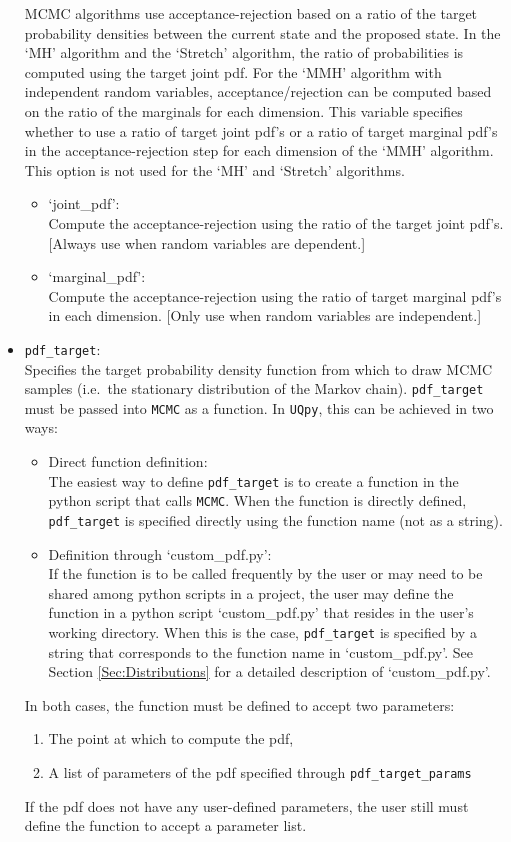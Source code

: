 \documentclass[./UsersGuide.tex]{subfiles}
\begin{document}
\begin{itemize}
	MCMC algorithms use acceptance-rejection based on a ratio of the target probability densities between the current state and the proposed state. In the `MH' algorithm and the 		`Stretch' algorithm, the ratio of probabilities is computed using the target joint pdf. For the `MMH' algorithm with independent random variables, acceptance/rejection can be computed 	based on the ratio of the marginals for each dimension. This variable specifies whether to use a ratio of target joint pdf's or a ratio of target marginal pdf's in the acceptance-rejection 	step for each dimension of the `MMH' algorithm. This option is not used for the `MH' and `Stretch' algorithms.
	\begin{itemize}
		\item `joint\_pdf': \\
			Compute the acceptance-rejection using the ratio of the target joint pdf's. [Always use when random variables are dependent.]
		\item `marginal\_pdf': \\
			Compute the acceptance-rejection using the ratio of target marginal pdf's in each dimension. [Only use when random variables are independent.]
	\end{itemize} 
\item \texttt{pdf\_target}:\\ 
	Specifies the target probability density function from which to draw MCMC samples (i.e.\ the stationary distribution of the Markov chain). \texttt{pdf\_target} must be passed into 		\texttt{MCMC} as a function. In \texttt{UQpy}, this can be achieved in two ways:
	\begin{itemize}
		\item Direct function definition:\\
		The easiest way to define \texttt{pdf\_target} is to create a function in the python script that calls \texttt{MCMC}. When the function is directly defined, \texttt{pdf\_target} is 			specified directly using the function name (not as a string). 
		\item Definition through `custom\_pdf.py':\\
		If the function is to be called frequently by the user or may need to be shared among python scripts in a project, the user may define the function in a python script 					`custom\_pdf.py' that resides in the user's working directory. When this is the case, \texttt{pdf\_target} is specified by a string that corresponds to the function name in 				`custom\_pdf.py'. See Section \ref{Sec:Distributions} for a detailed description of `custom\_pdf.py'.
	\end{itemize} 
	In both cases, the function must be defined to accept two parameters: 
	\begin{enumerate}
		\item The point at which to compute the pdf, 
		\item A list of parameters of the pdf specified through \texttt{pdf\_target\_params} 
	\end{enumerate}
	If the pdf does not have any user-defined parameters, the user still must define the function to accept a parameter list.\\


\end{itemize}
\end{document}
